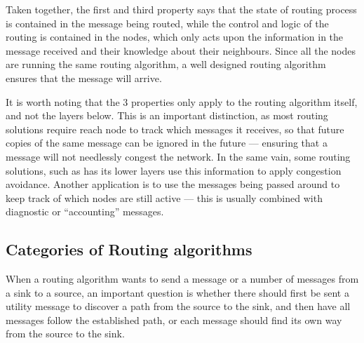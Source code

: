 \documentclass[letter, 12pt, english, draft]{article}
\begin{document}
Taken together, the first and third property says that the state of routing process is contained in the message being routed, while the control and logic of the routing is contained in the nodes, which only acts upon the information in the message received and their knowledge about their neighbours. Since all the nodes are running the same routing algorithm, a well designed routing algorithm ensures that the message will arrive.

\label{record-recived}
It is worth noting that the 3 properties only apply to the routing algorithm itself, and not the layers below. This is an important distinction, as most routing solutions require reach node to track which messages it receives, so that future copies of the same message can be ignored in the future --- ensuring that a message will not needlessly congest the network. In the same vain, some routing solutions, such as \cite{speed} has its lower layers use this information to apply congestion avoidance. Another application is to use the messages being passed around to keep track of which nodes are still active --- this is usually combined with diagnostic or ``accounting'' messages. 

\subsection{Categories of Routing algorithms}
When a routing algorithm wants to send a message or a number of messages from a sink to a source, an important question is whether there should first be sent a utility message to discover a path from the source to the sink, and then have all messages follow the established path, or each message should find its own way from the source to the sink.
\end{document}

